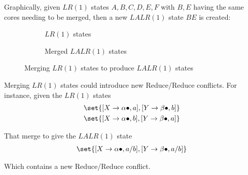 \begin{definition}
    Graphically, given $LR(1)$ states $A, B, C, D, E, F$ with $B, E$ having the same cores needing to be merged, then a new $LALR(1)$ state $BE$ is created:
    \begin{figure}[H]
        \centering
        \begin{subfigure}{0.45\textwidth}
            \centering
            \caption{$LR(1)$ states}
        \end{subfigure}
        \begin{subfigure}{0.45\textwidth}
            \centering
            \caption{Merged $LALR(1)$ states}
        \end{subfigure}
        \caption{Merging $LR(1)$ states to produce $LALR(1)$ states}
        \label{fig:lalr1-merge}
    \end{figure}
\end{definition}

\begin{remark}
    Merging $LR(1)$ states could introduce new Reduce/Reduce conflicts. For instance, given the $LR(1)$ states
    \begin{equation}
        \begin{aligned}
            &\set{ [X \to \alpha \bullet, a], [Y \to \beta \bullet, b] } \\
            &\set{ [X \to \alpha \bullet, b], [Y \to \beta \bullet, a] }
        \end{aligned}
    \end{equation}
    
    That merge to give the $LALR(1)$ state
    \begin{equation}
        \begin{aligned}
            \set{ [X \to \alpha \bullet, a/b], [Y \to \beta \bullet, a/b] }
        \end{aligned}
    \end{equation}
    
    Which contains a new Reduce/Reduce conflict.
\end{remark}
